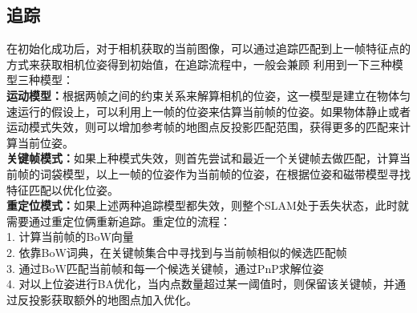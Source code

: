 \subsection{追踪}
在初始化成功后，对于相机获取的当前图像，可以通过追踪匹配到上一帧特征点的方式来获取相机位姿得到初始值，在追踪流程中，一般会兼顾
利用到一下三种模型三种模型：\\
\textbf{运动模型：}根据两帧之间的约束关系来解算相机的位姿，这一模型是建立在物体匀速运行的假设上，可以利用上一帧的位姿来估算当前帧的位姿。如果物体静止或者运动模式失效，则可以增加参考帧的地图点反投影匹配范围，获得更多的匹配来计算当前位姿。\\
\textbf{关键帧模式：}如果上种模式失效，则首先尝试和最近一个关键帧去做匹配，计算当前帧的词袋模型，以上一帧的位姿作为当前帧的位姿，在根据位姿和磁带模型寻找特征匹配以优化位姿。\\
\textbf{重定位模式：}如果上述两种追踪模型都失效，则整个SLAM处于丢失状态，此时就需要通过重定位俩重新追踪。重定位的流程：\\
1.	计算当前帧的BoW向量\\
2.	依靠BoW词典，在关键帧集合中寻找到与当前帧相似的候选匹配帧\\
3.	通过BoW匹配当前帧和每一个候选关键帧，通过PnP求解位姿\\
4.	对以上位姿进行BA优化，当内点数量超过某一阈值时，则保留该关键帧，并通过反投影获取额外的地图点加入优化。\\
